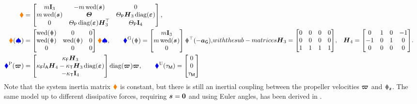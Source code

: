 \begin{subequations}
\begin{align}
 \sysInertiaMat &=
 \begin{bmatrix}
  \m \idMat[3] & -\m \wedOp(\bodyCOM{}{}) & 0 \\
  \m \wedOp(\bodyCOM{}{}) & \bodyMOI{}{}{} & \JP \mat{H}_3 \diag(\tuple{\PropDir})\\
  0 & \PropInertia \diag(\tuple{\PropDir}) \mat{H}_3^\top & \PropInertia \idMat[4] \\
 \end{bmatrix},
\\
 \gyroForce(\sysVel) &= 
 \begin{bmatrix} \wedOp(\w) & 0 & 0 \\ \wedOp(\v) & \wedOp(\w) & 0 \\ 0 & 0 & 0 \end{bmatrix}
 \sysInertiaMat \sysVel,
\qquad
 \genForceGravity(\R) = \begin{bmatrix} \m \idMat[3] \\ \m \wedOp(\bodyCOM{}{}) \\ 0 \end{bmatrix} \RT (-\gravityAcc),
\\
 \genForceProp(\tuple{\PropVel}) &= \begin{bmatrix} \kappaF \mat{H}_3 \\ \kappaF \ArmRadius \mat{H}_4 - \kappaT \mat{H}_3 \diag(\tuple{\PropDir})  \\ -\kappaT \idMat[4]  \end{bmatrix} \diag(\tuple{\PropVel}) \tuple{\PropVel},
\qquad
 \genForceInput(\BLDCTorque) = \begin{bmatrix} 0 \\ 0 \\ \BLDCTorque \end{bmatrix}
\end{align}
with the sub-matrices
\begin{align}
 \mat{H}_3 &= \begin{bmatrix}
  0 & 0 & 0 & 0 \\
  0 & 0 & 0 & 0 \\
  1 & 1 & 1 & 1
 \end{bmatrix}\!,&
 \mat{H}_4 &= \begin{bmatrix}
  0 & 1 & 0 & -1 \\
  -1 & 0 & 1 & 0 \\
  0 & 0 & 0 & 0
 \end{bmatrix}\!.
\end{align}
\end{subequations}
Note that the system inertia matrix $\boldsymbol{\textcolor{orange}{\blacklozenge}}$ is constant, but there is still an inertial coupling between the propeller velocities $\boldsymbol{\varpi_{}}$ and $\wz$.
The same model up to different dissipative forces, requiring $\bodyCOM{}{}{}=\tuple{0}$ and using Euler angles, has been derived in \cite{Martin:AccelerometerFeedback}.

